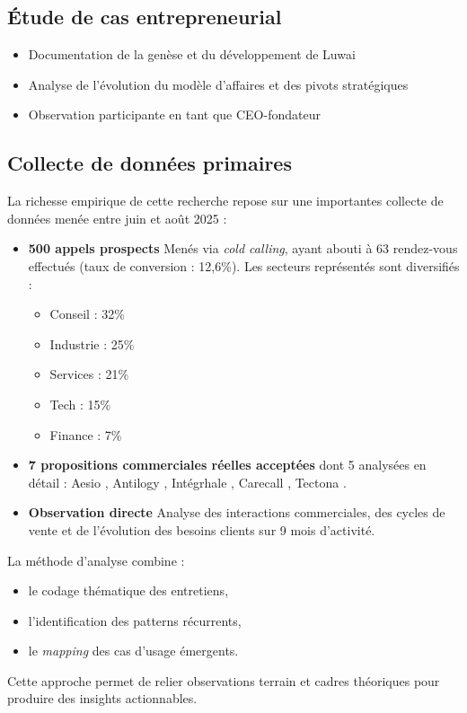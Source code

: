 \subsection{Étude de cas entrepreneurial}
\begin{itemize}
    \item Documentation de la genèse et du développement de Luwai
    \item Analyse de l'évolution du modèle d'affaires et des pivots stratégiques
    \item Observation participante en tant que CEO-fondateur
\end{itemize}

\subsection{Collecte de données primaires}
La richesse empirique de cette recherche repose sur une importantes collecte de données menée entre juin et août 2025 :
\medskip
\begin{itemize}
    \item \textbf{500 appels prospects}  
    Menés via \textit{cold calling}, ayant abouti à 63 rendez-vous effectués (taux de conversion : 12,6\%).  
    Les secteurs représentés sont diversifiés : 
    \begin{itemize}
        \item Conseil : 32\%
        \item Industrie : 25\%
        \item Services : 21\%
        \item Tech : 15\%
        \item Finance : 7\%
    \end{itemize}

    \item \textbf{7 propositions commerciales réelles acceptées} dont 5 analysées en détail :  
    Aesio \cite{luwai2025aesio}, Antilogy \cite{luwai2025antilogy}, Intégrhale \cite{luwai2025integrhale}, Carecall \cite{luwai2025carecall}, Tectona \cite{luwai2025tectona}.
    
    \item \textbf{Observation directe}  
    Analyse des interactions commerciales, des cycles de vente et de l’évolution des besoins clients sur 9 mois d’activité.
\end{itemize}

\medskip
La méthode d’analyse combine :
\begin{itemize}
    \item le codage thématique des entretiens,
    \item l’identification des patterns récurrents,
    \item le \textit{mapping} des cas d’usage émergents.
\end{itemize}
\medskip
Cette approche permet de relier observations terrain et cadres théoriques pour produire des insights actionnables.

